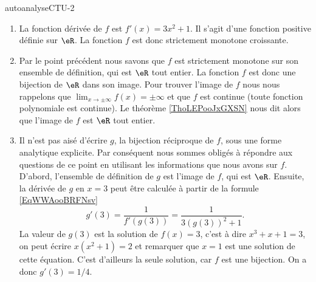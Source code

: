 
\begin{corrige}{autoanalyseCTU-2}


\begin{enumerate}
\item La fonction dérivée de $f$ est  $f'(x) = 3x^2 + 1$. Il s'agit d'une fonction positive définie sur $\eR$. La fonction $f$ est donc strictement monotone croissante. 
\item Par le point précédent nous savons que $f$ est strictement monotone sur son ensemble de définition, qui est $\eR$ tout entier. La fonction $f$ est donc une bijection de $\eR$ dans son image. Pour trouver l'image de $f$ nous nous rappelons que $\lim_{x\to \pm\infty} f(x) = \pm\infty$ et que $f$ est continue (toute fonction polynomiale est continue). Le théorème \ref{ThoLEPooJxGXSN} nous dit alors que l'image de $f$ est $\eR$ tout entier. 
\item Il n'est pas aisé d'écrire $g$, la bijection réciproque de $f$, sous une forme analytique explicite. Par conséquent nous sommes obligés à répondre aux questions de ce point en utilisant les informations que nous avons sur $f$. D'abord, l'ensemble de définition de $g$ est l'image de $f$, qui est $\eR$. Ensuite, la dérivée de $g$ en $x=3$ peut \^etre calculée à partir de la formule \eqref{EqWWAooBRFNsv} 
  \begin{equation*}
    g'(3) = \frac{1}{f'(g(3))} = \frac{1}{3(g(3))^2 +1}.
  \end{equation*}
La valeur de $g(3)$ est la solution de $f(x) = 3$, c'est à dire $x^3+x+1 = 3$, on peut écrire $x(x^2+1) = 2$ et remarquer que $x=1$ est une solution de cette équation. C'est d'ailleurs la seule solution, car $f$ est une bijection. On a donc $g'(3) = 1/4$.
\end{enumerate}

\end{corrige}   
